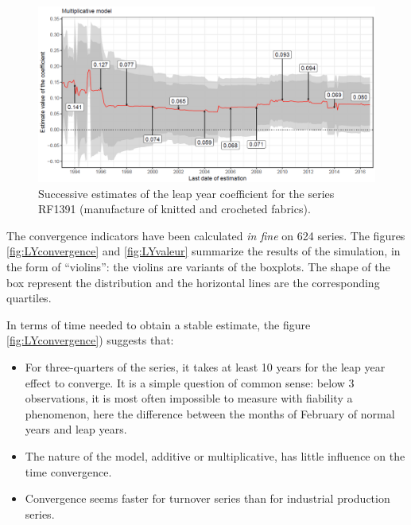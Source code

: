 \documentclass[12pt, a4paper]{article}
\begin{document}
\begin{figure}[!ht]
\begin{center}
 \includegraphics[scale=0.50]{img/LYexemple2.png}
 \caption[Successive estimates of the leap year coefficient for the series RF139 (manufacture of
knitted and crocheted fabrics)]{Successive estimates of the leap year coefficient for the series RF1391 (manufacture of
knitted and crocheted fabrics).}
 \label{fig:LYexemple2}
\end{center}
\end{figure}
The convergence indicators have been calculated \emph{in fine} on 624 series. The figures \ref{fig:LYconvergence} and \ref{fig:LYvaleur} summarize the results of the simulation, in the form of ``violins'': the violins are variants of the boxplots. The shape of the box represent the distribution and the horizontal lines are the corresponding quartiles.


In terms of time needed to obtain a stable estimate, the figure \ref{fig:LYconvergence}) suggests that:
\begin{itemize}
	\item For three-quarters of the series, it takes at least 10 years for the leap year effect to converge. It is a simple question of common sense: below 3 observations, it is most often impossible to measure with fiability a phenomenon, here the difference between the months of February of normal years and leap years.
		\item The nature of the model, additive or multiplicative, has little influence on the time convergence.
	\item Convergence seems faster for turnover series than for industrial production series.
\end{itemize}
\end{document}
